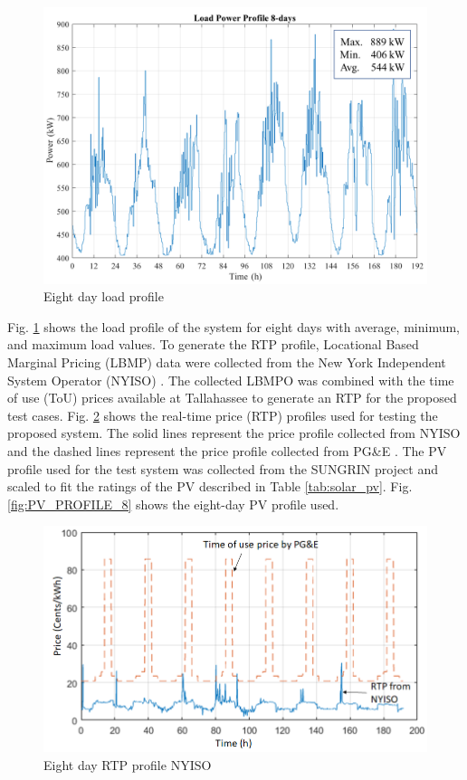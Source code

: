 \begin{figure}[!ht]
    \centering
    \includegraphics[width = 0.8\linewidth]{figs/loadprofile.png}
    \caption{Eight day load profile}
    \label{fig:LOAD_PROFILE_8}
\end{figure}


Fig. \ref{fig:LOAD_PROFILE_8} shows the load profile of the system for eight days with average, minimum, and maximum load values. To generate the RTP profile, Locational Based Marginal Pricing (LBMP) data were collected from the New York Independent System Operator (NYISO) \cite{NYISO2017}. The collected LBMPO was combined with the time of use (ToU) prices available at Tallahassee to generate an RTP for the proposed test cases. Fig. \ref{fig:RTP_PROFILE_8} shows the real-time price (RTP) profiles used for testing the proposed system. The solid lines represent the price profile collected from NYISO and the dashed lines represent the price profile collected from PG\&E \cite{pgne}. The PV profile used for the test system was collected from the SUNGRIN project and scaled to fit the ratings of the PV described in Table \ref{tab:solar_pv}. Fig. \ref{fig:PV_PROFILE_8} shows the eight-day PV profile used.



\begin{figure}[!ht]
    \centering
    \includegraphics[width = 0.8\linewidth]{figs/Price_profiles.png}
    \caption{Eight day RTP profile NYISO}
    \label{fig:RTP_PROFILE_8}
\end{figure}

